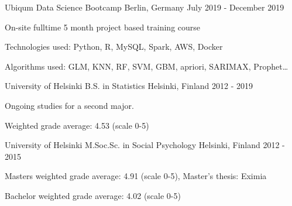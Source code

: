 

\begin{cventries}


  \cventry
    {Ubiqum} %
    {Data Science Bootcamp} %
    {Berlin, Germany} %
    {July 2019 - December 2019} %
    {
      \begin{cvitems} %
        \item {On-site fulltime 5 month project based training course}
        \item {Technologies used: Python, R, MySQL, Spark, AWS, Docker}
        \item {Algorithms used: GLM, KNN, RF, SVM, GBM, apriori, SARIMAX, Prophet\ldots}
      \end{cvitems}
    }

  \cventry
    {University of Helsinki} %
    {B.S. in Statistics} %
    {Helsinki, Finland} %
    {2012 - 2019} %
    {
      \begin{cvitems} %
        \item {Ongoing studies for a second major.}
        \item {Weighted grade average: 4.53 (scale 0-5)}
      \end{cvitems}
    }

  \cventry
    {University of Helsinki} %
    {M.Soc.Sc. in Social Psychology} %
    {Helsinki, Finland} %
    {2012 - 2015} %
    {
      \begin{cvitems} %
        \item {Masters weighted grade average: 4.91 (scale 0-5), Master's thesis: Eximia}
        \item {Bachelor weighted grade average: 4.02 (scale 0-5)}
      \end{cvitems}
    }

\end{cventries}

